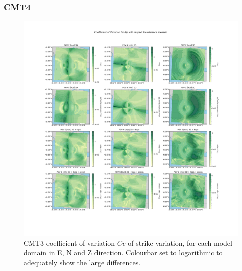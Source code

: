 \documentclass[../Text/00main.tex]{subfiles}
\begin{document}
\subsubsection{CMT4}
\begin{figure}[!h]
    \centering
    \includegraphics[width=1.2\linewidth]{images_results/dip_variation_sigma_sc3.png}
    \caption{CMT3 coefficient of variation $Cv$ of strike variation, for each model domain in E, N and Z direction. Colourbar set to logarithmic to adequately show the large differences.}
    \label{fig:cmt3sigm}
\end{figure}
\end{document}
